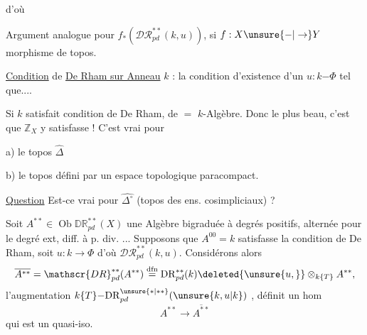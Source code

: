 d'où

Argument analogue pour $f_*(\mathscr{DR}^{**}_{pd}(k,u))$, si $f:X\unsure{\mathord{-}|\to}Y$ morphisme de topos.

\uline{Condition} de \uline{De Rham sur Anneau} $k$ : la condition d'existence d'un $u:k\mathord{-}\Phi$ tel que....

Si $k$ satisfait condition de De Rham, de $=$  $k$-Algèbre. Donc le plus beau, c'est que $\mathbb Z_X$ y satisfasse ! C'est vrai pour

a) le topos  $\widehat{\Delta}$

b) le topos défini par un espace topologique paracompact.

\uline{Question} Est-ce vrai pour $\widehat{\Delta^\circ}$ (topos des ens. cosimpliciaux) ? 

Soit $A^{**}\in\operatorname{Ob}\mathbb{DR}^{**}_{pd}(X)$ une Algèbre bigraduée à degrés positifs, alternée pour le degré ext, diff. à p. div. ... Supposons que $A^{00}=k$ satisfasse la condition de De Rham, soit $u:k\longrightarrow\Phi$ d'où $\mathscr{DR}^{**}_{pd}(k,u)$. Considérons alors
\[
\overline{A^{**}}=\mathscr{DR}^{**}_{pd}(A^{**})\overset{\mathrm{dfn}}{=}\mathrm{DR}^{**}_{pd}(k)\deleted{\unsure{u,}}\otimes_{k\{T\}}A^{**},
\]
l'augmentation $k\{T\}\mathord{-}\mathrm{DR}_{pd}^{\unsure{*|**}}(\unsure{k,u|k})$ , définit un hom
\[
A^{**}\longrightarrow\overline{A^{**}}
\]
qui est un quasi-iso. 
